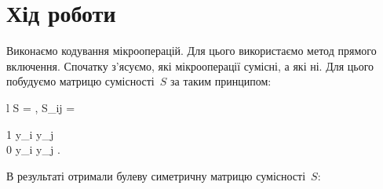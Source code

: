\documentclass[a4paper,oneside,DIV=12,12pt,headings=normal]{scrartcl}
\begin{document}
	\section{Хід роботи}
			Виконаємо кодування мікрооперацій. Для цього використаємо метод прямого включення. Спочатку з'ясуємо, які мікрооперації сумісні, а які ні. Для цього побудуємо матрицю сумісності~$S$ за таким принципом:
			\begin{IEEEeqnarray*}{l}
				S = ,
				\quad
				S_{ij} =
				\begin{cases}
					1  y_i y_j \\
					0  y_i y_j .
				\end{cases}
			\end{IEEEeqnarray*}
			В результаті отримали булеву симетричну матрицю сумісності~$S$:
\end{document}
